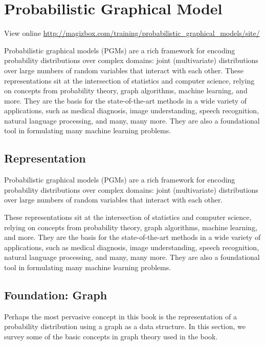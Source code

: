 \chapter{Probabilistic Graphical Model}

View online \href{http://magizbox.com/training/probabilistic_graphical_models/site/}{http://magizbox.com/training/probabilistic_graphical_models/site/}

Probabilistic graphical models (PGMs) are a rich framework for encoding probability distributions over complex domains: joint (multivariate) distributions over large numbers of random variables that interact with each other. These representations sit at the intersection of statistics and computer science, relying on concepts from probability theory, graph algorithms, machine learning, and more. They are the basis for the state-of-the-art methods in a wide variety of applications, such as medical diagnosis, image understanding, speech recognition, natural language processing, and many, many more. They are also a foundational tool in formulating many machine learning problems.

\section{Representation}

Probabilistic graphical models (PGMs) are a rich framework for encoding probability distributions over complex domains: joint (multivariate) distributions over large numbers of random variables that interact with each other.

These representations sit at the intersection of statistics and computer science, relying on concepts from probability theory, graph algorithms, machine learning, and more. They are the basis for the state-of-the-art methods in a wide variety of applications, such as medical diagnosis, image understanding, speech recognition, natural language processing, and many, many more. They are also a foundational tool in formulating many machine learning problems.

\section{Foundation: Graph}

Perhaps the most pervasive concept in this book is the representation of a probability distribution using a graph as a data structure. In this section, we survey some of the basic concepts in graph theory used in the book.

